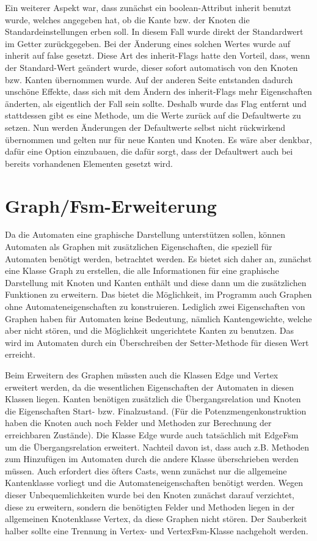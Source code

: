 Ein weiterer Aspekt war, dass zunächst ein boolean-Attribut inherit benutzt wurde, welches angegeben hat, ob die Kante bzw. der Knoten die Standardeinstellungen erben soll. In diesem Fall wurde direkt der Standardwert im Getter zurückgegeben. Bei der Änderung eines solchen Wertes wurde auf inherit auf false gesetzt. Diese Art des inherit-Flags hatte den Vorteil, dass, wenn der Standard-Wert geändert wurde, dieser sofort automatisch von den Knoten bzw. Kanten übernommen wurde. Auf der anderen Seite entstanden dadurch unschöne Effekte, dass sich  mit dem Ändern des inherit-Flags mehr Eigenschaften änderten, als eigentlich der Fall sein sollte. Deshalb wurde das Flag entfernt und stattdessen gibt es eine Methode, um die Werte zurück auf die Defaultwerte zu setzen. Nun werden Änderungen der Defaultwerte selbst nicht rückwirkend übernommen und gelten nur für neue Kanten und Knoten. Es wäre aber denkbar, dafür eine Option einzubauen, die dafür sorgt, dass der Defaultwert auch bei bereits vorhandenen Elementen gesetzt wird.
\section{Graph/Fsm-Erweiterung}
Da die Automaten eine graphische Darstellung unterstützen sollen, können Automaten als Graphen mit zusätzlichen Eigenschaften, die speziell für Automaten benötigt werden, betrachtet werden. Es bietet sich daher an, zunächst eine Klasse Graph zu erstellen, die alle Informationen für eine graphische Darstellung mit Knoten und Kanten enthält und diese dann um die zusätzlichen Funktionen zu erweitern. Das bietet die Möglichkeit, im Programm auch Graphen ohne Automateneigenschaften zu konstruieren. Lediglich zwei Eigenschaften von Graphen haben für Automaten keine Bedeutung, nämlich Kantengewichte, welche aber nicht stören, und die Möglichkeit ungerichtete Kanten zu benutzen. Das wird im Automaten durch ein Überschreiben der Setter-Methode für diesen Wert erreicht.

Beim Erweitern des Graphen müssten auch die Klassen Edge und Vertex erweitert werden, da die wesentlichen Eigenschaften der Automaten in diesen Klassen liegen. Kanten benötigen zusätzlich die Übergangsrelation und Knoten die Eigenschaften Start- bzw. Finalzustand. (Für die Potenzmengenkonstruktion haben die Knoten auch noch Felder und Methoden zur Berechnung der erreichbaren Zustände). Die Klasse Edge wurde auch tatsächlich mit EdgeFsm um die Übergangsrelation erweitert. Nachteil davon ist, dass auch z.B. Methoden zum Hinzufügen im Automaten durch die andere Klasse überschrieben werden müssen. Auch erfordert dies öfters Casts, wenn zunächst nur die allgemeine Kantenklasse vorliegt und die Automateneigenschaften benötigt werden. Wegen dieser Unbequemlichkeiten wurde bei den Knoten zunächst darauf verzichtet, diese zu erweitern, sondern die benötigten Felder und Methoden liegen in der allgemeinen Knotenklasse Vertex, da diese Graphen nicht stören. Der Sauberkeit halber sollte eine Trennung in Vertex- und VertexFsm-Klasse nachgeholt werden.
